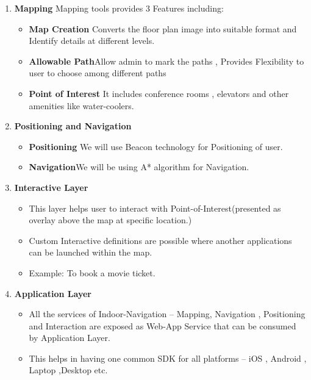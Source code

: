 ﻿\documentclass[a4paper, 12pt]{article}
\begin{document}
\begin{enumerate}
 \item \textbf{Mapping}
\linebreak
\linebreak
Mapping tools provides 3 Features including:

\begin{itemize}
	\item \textbf{Map Creation} Converts the floor plan image into suitable format and Identify details at different levels.
	
	\item	\textbf{Allowable Path}Allow admin to mark the paths , Provides Flexibility to user to choose among different paths
	
	\item	\textbf{Point of Interest} It includes conference rooms , elevators and other amenities like water-coolers.
	
\end{itemize}

	\item \textbf{Positioning and Navigation}

	\begin{itemize}
		\item \textbf{Positioning} We will use Beacon technology for Positioning of user.
		
		\item	\textbf{Navigation}We will be using A* algorithm for Navigation.
		
	\end{itemize}

\item \textbf{Interactive Layer}

\begin{itemize}
	\item This layer helps user to interact with Point-of-Interest(presented as overlay above the map at specific location.)
	
	\item	Custom Interactive definitions are possible where another applications can be launched within the map.
	
	\item Example: To book a movie ticket.
	
\end{itemize}

\item \textbf{Application Layer}

\begin{itemize}
	\item All the services of Indoor-Navigation – Mapping, Navigation , Positioning and Interaction are exposed as Web-App Service that can be consumed by Application Layer.
	
	\item	This helps in having one common SDK for all platforms – iOS , Android , Laptop ,Desktop etc.
	
\end{itemize}
\end{enumerate}
\end{document}
